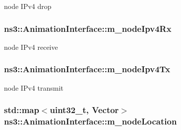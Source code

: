 node I\+Pv4 drop 

\subsubsection[{\texorpdfstring{m\+\_\+node\+Ipv4\+Rx}{m_nodeIpv4Rx}}]{ ns3\+::\+Animation\+Interface\+::m\+\_\+node\+Ipv4\+Rx\hspace{0.3cm}{\ttfamily [private]}}\hypertarget{classns3_1_1AnimationInterface_a62b1c49cad16b618d8e81ca8bcfca862}{}\label{classns3_1_1AnimationInterface_a62b1c49cad16b618d8e81ca8bcfca862}


node I\+Pv4 receive 

\subsubsection[{\texorpdfstring{m\+\_\+node\+Ipv4\+Tx}{m_nodeIpv4Tx}}]{ ns3\+::\+Animation\+Interface\+::m\+\_\+node\+Ipv4\+Tx\hspace{0.3cm}{\ttfamily [private]}}\hypertarget{classns3_1_1AnimationInterface_a20c6461b4020c35c0a004db0b910c8e5}{}\label{classns3_1_1AnimationInterface_a20c6461b4020c35c0a004db0b910c8e5}


node I\+Pv4 transmit 

\subsubsection[{\texorpdfstring{m\+\_\+node\+Location}{m_nodeLocation}}]{\setlength{\rightskip}{0pt plus 5cm}std\+::map$<$uint32\+\_\+t, Vector$>$ ns3\+::\+Animation\+Interface\+::m\+\_\+node\+Location\hspace{0.3cm}{\ttfamily [private]}}\hypertarget{classns3_1_1AnimationInterface_a4ff501bdb4d16525b521e7f42fe563f4}{}\label{classns3_1_1AnimationInterface_a4ff501bdb4d16525b521e7f42fe563f4}


